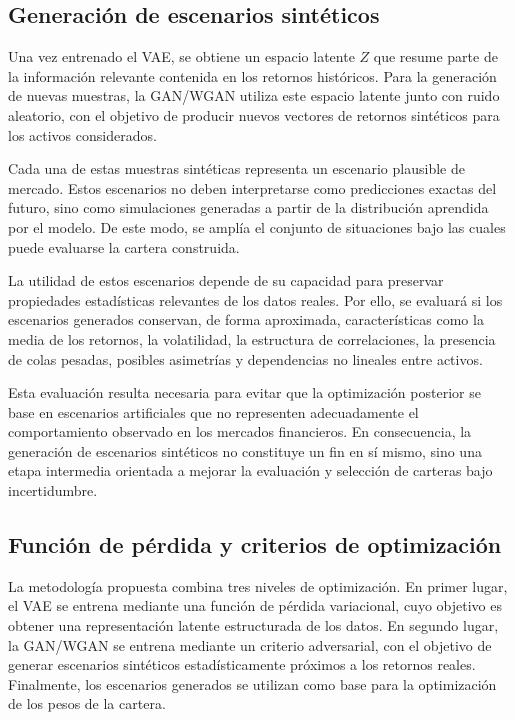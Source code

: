 \subsection{Generación de escenarios sintéticos}

Una vez entrenado el VAE, se obtiene un espacio latente $Z$ que resume parte de la información relevante contenida en los retornos históricos. Para la generación de nuevas muestras, la GAN/WGAN utiliza este espacio latente junto con ruido aleatorio, con el objetivo de producir nuevos vectores de retornos sintéticos para los activos considerados.

Cada una de estas muestras sintéticas representa un escenario plausible de mercado. Estos escenarios no deben interpretarse como predicciones exactas del futuro, sino como simulaciones generadas a partir de la distribución aprendida por el modelo. De este modo, se amplía el conjunto de situaciones bajo las cuales puede evaluarse la cartera construida.

La utilidad de estos escenarios depende de su capacidad para preservar propiedades estadísticas relevantes de los datos reales. Por ello, se evaluará si los escenarios generados conservan, de forma aproximada, características como la media de los retornos, la volatilidad, la estructura de correlaciones, la presencia de colas pesadas, posibles asimetrías y dependencias no lineales entre activos.

Esta evaluación resulta necesaria para evitar que la optimización posterior se base en escenarios artificiales que no representen adecuadamente el comportamiento observado en los mercados financieros. En consecuencia, la generación de escenarios sintéticos no constituye un fin en sí mismo, sino una etapa intermedia orientada a mejorar la evaluación y selección de carteras bajo incertidumbre.

\subsection{Función de pérdida y criterios de optimización}

La metodología propuesta combina tres niveles de optimización. En primer lugar, el VAE se entrena mediante una función de pérdida variacional, cuyo objetivo es obtener una representación latente estructurada de los datos. En segundo lugar, la GAN/WGAN se entrena mediante un criterio adversarial, con el objetivo de generar escenarios sintéticos estadísticamente próximos a los retornos reales. Finalmente, los escenarios generados se utilizan como base para la optimización de los pesos de la cartera.

